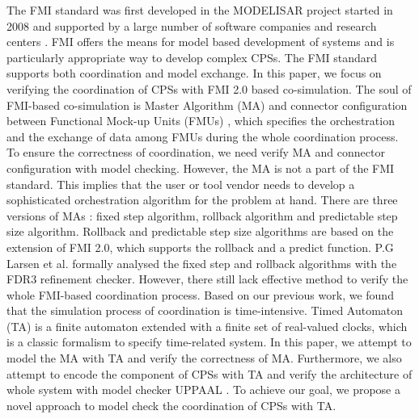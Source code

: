 The FMI standard was first developed in the MODELISAR project started in 2008 and supported by a large number of software companies and research centers \cite{ClauMODELISAR}. FMI offers the means for model based development of systems and is particularly appropriate way to develop complex CPSs. The FMI standard supports both coordination and  model exchange. In this paper, we focus on verifying the coordination of CPSs with FMI 2.0 based co-simulation.
The soul of FMI-based co-simulation is Master Algorithm (MA) \cite{AckerDVM15} and connector configuration between Functional Mock-up Units (FMUs) \cite{Tripakis15}, which specifies the orchestration and the exchange of data among FMUs during the whole coordination process. To ensure the correctness of coordination, we need verify MA and connector configuration with model checking. However, the MA is not a part of the FMI standard. This implies that the user or tool vendor needs to develop a sophisticated orchestration algorithm for the problem at hand. 
There are three versions of MAs \cite{BromanBGLMTW13}: fixed step algorithm, rollback algorithm and predictable step size algorithm. Rollback and predictable step size algorithms are based on the extension of FMI 2.0, which supports the rollback and a predict function. P.G Larsen et al. \cite{Larsen2016Integrated} formally analysed the fixed step and rollback algorithms with the FDR3 refinement checker. However, there still lack effective method to verify the whole FMI-based coordination process. Based on our previous work, we found that the simulation process of coordination is time-intensive. Timed Automaton (TA) \cite{BehrmannDLHPYH06} is a finite automaton extended with a finite set of real-valued clocks, which is a classic formalism to specify time-related system. In this paper, we attempt to model the MA with TA and verify the correctness of MA. Furthermore, we also attempt to encode the component of CPSs with TA and verify the architecture of whole system with model checker UPPAAL \cite{BehrmannDLHPYH06}. To achieve our goal, we propose a novel approach to model check the coordination of CPSs with TA.

